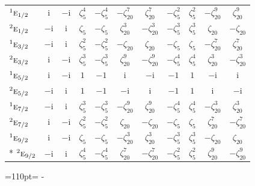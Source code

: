 \documentclass[10pt,a4paper]{article}
\makeatletter
\def\grouprule#1#2{\noalign{\marks\LTgroupmarks{\the\belowrulesep}\nobreak\vskip#1%
  \vskip\aboverulesep}\multispan\LT@cols\unskip{\leaders\hrule\@height#2\hfill\kern\z@}\cr
  \noalign{\penalty\LTrulebreak\vskip\belowrulesep\global\@lastruleclass\z@}}
\newcommand{\needspace}[1]{\par\penalty-100\begingroup\dimen0=#1\relax\dimen2=\pagegoal
  \advance\dimen2-\pagetotal\ifdim\dimen0>\dimen2\relax\ifdim\dimen2>0pt\vfil\break\fi\fi
  \endgroup}
\numberwithin{equation}{section}
\newcommand{\irr}[1]{\text{\normalfont\scshape #1}}
\newcommand{\conjpair}[1]{{}^{#1}}
\newcommand{\iunit}{\mathrm{i}}
\newcommand{\rootunity}[1]{\zeta_{#1}}
\makeatother
\begin{document}
{\begin{longtable}{@{}lcccccccccc@{}}
\grouprule{0pt}{\lightrulewidth}
$\conjpair{1}\irr{e}_{1/2}$ & $\iunit{}$ & $-\iunit{}$ & $\rootunity{5}^{4}$ & $-\rootunity{5}^{4}$ & $-\rootunity{20}^{7}$ & $\rootunity{20}^{7}$ & $-\rootunity{5}^{2}$ & $\rootunity{5}^{2}$ & $-\rootunity{20}^{9}$ & $\rootunity{20}^{9}$\\
$\conjpair{2}\irr{e}_{1/2}$ & $-\iunit{}$ & $\iunit{}$ & $\rootunity{5}$ & $-\rootunity{5}$ & $\rootunity{20}^{3}$ & $-\rootunity{20}^{3}$ & $-\rootunity{5}^{3}$ & $\rootunity{5}^{3}$ & $\rootunity{20}$ & $-\rootunity{20}$\\
$\conjpair{1}\irr{e}_{3/2}$ & $-\iunit{}$ & $\iunit{}$ & $\rootunity{5}^{2}$ & $-\rootunity{5}^{2}$ & $-\rootunity{20}$ & $\rootunity{20}$ & $-\rootunity{5}$ & $\rootunity{5}$ & $-\rootunity{20}^{7}$ & $\rootunity{20}^{7}$\\
$\conjpair{2}\irr{e}_{3/2}$ & $\iunit{}$ & $-\iunit{}$ & $\rootunity{5}^{3}$ & $-\rootunity{5}^{3}$ & $\rootunity{20}^{9}$ & $-\rootunity{20}^{9}$ & $-\rootunity{5}^{4}$ & $\rootunity{5}^{4}$ & $\rootunity{20}^{3}$ & $-\rootunity{20}^{3}$\\
$\conjpair{1}\irr{e}_{5/2}$ & $\iunit{}$ & $-\iunit{}$ & $1$ & $-1$ & $\iunit{}$ & $-\iunit{}$ & $-1$ & $1$ & $-\iunit{}$ & $\iunit{}$\\
$\conjpair{2}\irr{e}_{5/2}$ & $-\iunit{}$ & $\iunit{}$ & $1$ & $-1$ & $-\iunit{}$ & $\iunit{}$ & $-1$ & $1$ & $\iunit{}$ & $-\iunit{}$\\
$\conjpair{1}\irr{e}_{7/2}$ & $-\iunit{}$ & $\iunit{}$ & $\rootunity{5}^{3}$ & $-\rootunity{5}^{3}$ & $-\rootunity{20}^{9}$ & $\rootunity{20}^{9}$ & $-\rootunity{5}^{4}$ & $\rootunity{5}^{4}$ & $-\rootunity{20}^{3}$ & $\rootunity{20}^{3}$\\
$\conjpair{2}\irr{e}_{7/2}$ & $\iunit{}$ & $-\iunit{}$ & $\rootunity{5}^{2}$ & $-\rootunity{5}^{2}$ & $\rootunity{20}$ & $-\rootunity{20}$ & $-\rootunity{5}$ & $\rootunity{5}$ & $\rootunity{20}^{7}$ & $-\rootunity{20}^{7}$\\
$\conjpair{1}\irr{e}_{9/2}$ & $\iunit{}$ & $-\iunit{}$ & $\rootunity{5}$ & $-\rootunity{5}$ & $-\rootunity{20}^{3}$ & $\rootunity{20}^{3}$ & $-\rootunity{5}^{3}$ & $\rootunity{5}^{3}$ & $-\rootunity{20}$ & $\rootunity{20}$\\*
$\conjpair{2}\irr{e}_{9/2}$ & $-\iunit{}$ & $\iunit{}$ & $\rootunity{5}^{4}$ & $-\rootunity{5}^{4}$ & $\rootunity{20}^{7}$ & $-\rootunity{20}^{7}$ & $-\rootunity{5}^{2}$ & $\rootunity{5}^{2}$ & $\rootunity{20}^{9}$ & $-\rootunity{20}^{9}$\\
\bottomrule\end{longtable}}
\needspace{110pt}
\end{document}
